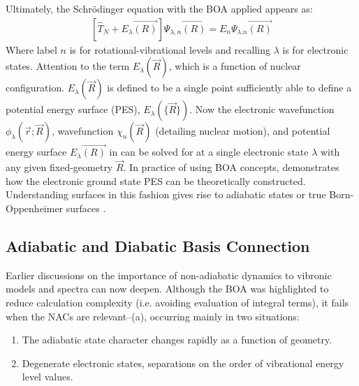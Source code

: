 \documentclass[letterpaper, 12pt, oneside]{report}
\begin{document}
Ultimately, the Schrödinger equation with the BOA applied appears as:
\begin{equation}\label{eq:10}
    \begin{split} 
            \left[ \hat{T}_N + E_{\lambda} \Vec{(R)} \right] \Psi_{\lambda, n} \Vec{(R)} = E_{n} \Psi_{\lambda. n} \Vec{(R)}
    \end{split}
\end{equation}
Where label $n$ is for rotational-vibrational levels and recalling $\lambda$ is for electronic states. Attention to the term $E_{\lambda}(\Vec{R})$, which is a function of nuclear configuration. %
$E_{\lambda}(\Vec{R})$ is defined to be a single point sufficiently able to define a potential energy surface (PES), $E_{\lambda}(\{ \Vec{R} \})$. Now the electronic wavefunction $\phi_{\lambda} (\Vec{r};\Vec{R})$, wavefunction $\chi_{n} (\Vec{R})$ (detailing nuclear motion), and potential energy surface $E_{\lambda} \Vec{(R)}$ in  can be solved for  at a single electronic state $\lambda$ with any given fixed-geometry $\Vec{R}$. In practice of using BOA concepts,  demonstrates how the electronic ground state PES can be theoretically constructed. Understanding surfaces in this fashion gives rise to adiabatic states or true Born-Oppenheimer surfaces \cite{villanueva2020spectroscopic}. 
\\


\newpage
\subsection{Adiabatic and Diabatic Basis Connection}
Earlier discussions on the importance of non-adiabatic dynamics to vibronic models and spectra can now deepen. Although the BOA was highlighted to reduce calculation complexity (i.e. avoiding evaluation of integral terms), it fails when the NACs are relevant--(a), occurring mainly in two situations:
\begin{enumerate}[label=\roman*.]
    \item The adiabatic state character changes rapidly as a function of geometry.
    \item Degenerate electronic states, separations on the order of vibrational energy level values.
\end{enumerate}
\end{document}
